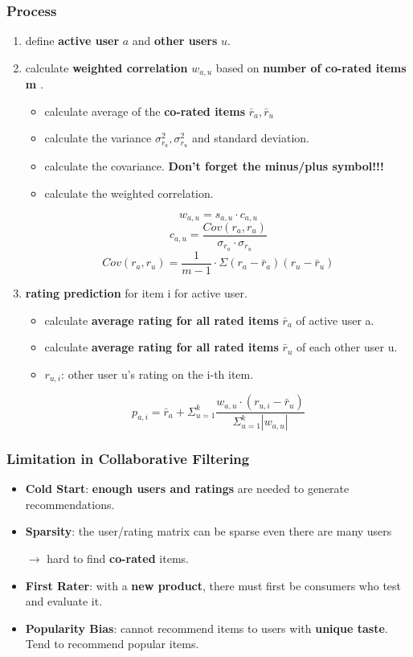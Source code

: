 \subsubsection{Process}
\begin{enumerate}[label= \protect \circled{\arabic*} ]
	\item define \textbf{active user} $a$ and \textbf{other users} $u$.
	\item calculate \textbf{weighted correlation} $w_{a,u}$ based on \textbf{number of co-rated items m} . 
	\begin{itemize}
		\item calculate average of the \textbf{co-rated items} $\bar{r}_a, \bar{r}_u$
		\item calculate the variance $\sigma_{r_{a}}^2, \sigma_{r_{u}}^2$ and standard deviation.
		\item calculate the covariance. \textbf{Don't forget the minus/plus symbol!!!} 
		\item calculate the weighted correlation.
	\end{itemize}
	
	$$w_{a,u} = s_{a,u} \cdot c_{a,u}$$ 
	$$c_{a,u} = \frac{Cov(r_{a}, r_{u})}{\sigma_{r_{a}} \cdot \sigma_{r_{u}}}$$
	$$Cov(r_{a}, r_{u}) = \frac{1}{m-1}\cdot \Sigma (r_a - \bar{r}_a) (r_u - \bar{r}_u)$$
	\item \textbf{rating prediction} for item i for active user.
	\begin{itemize}
		\item calculate \textbf{average rating for all rated items} $\bar{r}_a$ of active user a. 
		\item calculate \textbf{average rating for all rated items} $\bar{r}_u$ of each other user u.
		\item $r_{u,i}$: other user u's rating on the i-th item.
	\end{itemize}
	$$p_{a,i} = \bar{r}_a + \Sigma_{u = 1}^k \dfrac{w_{a,u} \cdot (r_{u,i} - \bar{r}_u)}{\Sigma_{u=1}^k |w_{a,u}|}$$
\end{enumerate}	

\subsubsection{Limitation in Collaborative Filtering}
\begin{itemize}
	\item \textbf{Cold Start}: \textbf{enough users and ratings} are needed to generate recommendations.
	\item \textbf{Sparsity}: the user/rating matrix can be sparse even there are many users 
	
	$\rightarrow$ hard to find \textbf{co-rated} items.
	\item \textbf{First Rater}: with a \textbf{new product}, there must first be consumers who test and evaluate it. 
	\item \textbf{Popularity Bias}: cannot recommend items to users with \textbf{unique taste}. Tend to recommend popular items.
\end{itemize}

